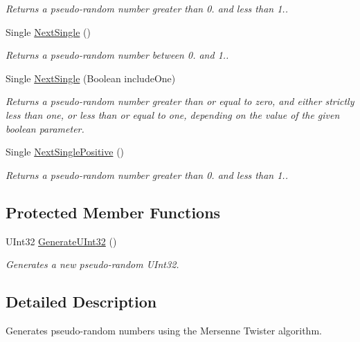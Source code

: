 \begin{DoxyCompactItemize}
\begin{DoxyCompactList}\small\item\em Returns a pseudo-\/random number greater than 0. and less than 1.. \end{DoxyCompactList}\item 
Single \hyperlink{class_u_m_t_1_1_mersenne_twister_abc37a49f3c72309e0ad61261f65cf6a2}{Next\+Single} ()
\begin{DoxyCompactList}\small\item\em Returns a pseudo-\/random number between 0. and 1.. \end{DoxyCompactList}\item 
Single \hyperlink{class_u_m_t_1_1_mersenne_twister_aaba6c5b81f5697b14edc19f923576b1e}{Next\+Single} (Boolean include\+One)
\begin{DoxyCompactList}\small\item\em Returns a pseudo-\/random number greater than or equal to zero, and either strictly less than one, or less than or equal to one, depending on the value of the given boolean parameter. \end{DoxyCompactList}\item 
Single \hyperlink{class_u_m_t_1_1_mersenne_twister_a3770994cf65ccac5570ffa2291d15a16}{Next\+Single\+Positive} ()
\begin{DoxyCompactList}\small\item\em Returns a pseudo-\/random number greater than 0. and less than 1.. \end{DoxyCompactList}\end{DoxyCompactItemize}
\subsection*{Protected Member Functions}
\begin{DoxyCompactItemize}
\item 
U\+Int32 \hyperlink{class_u_m_t_1_1_mersenne_twister_a6a5bd3b3327bce890c8a6456fe8d1207}{Generate\+U\+Int32} ()
\begin{DoxyCompactList}\small\item\em Generates a new pseudo-\/random U\+Int32. \end{DoxyCompactList}\end{DoxyCompactItemize}


\subsection{Detailed Description}
Generates pseudo-\/random numbers using the Mersenne Twister algorithm. 

